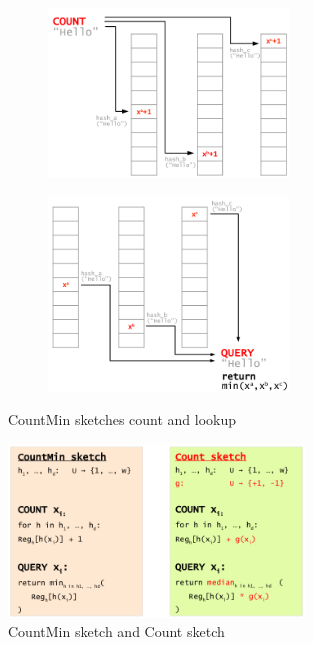 \documentclass[11pt,oneside,a4paper]{article}
\begin{document}
\begin{figure}[b!]
	\centering
	\begin{subfigure}[t]{.5\textwidth}
		\centering
		\includegraphics[width=0.7\textwidth,scale=1]{figures/countminsketch_count}
		\label{fig:countminsketch_count}
	\end{subfigure}%
	\begin{subfigure}[t]{.5\textwidth}
		\centering
		\includegraphics[width=0.7\textwidth,scale=1]{figures/countminsketch_lookup}
		\label{fig:countminsketch_lookup}
	\end{subfigure}
	\caption{CountMin sketches count and lookup \cite{advnet}}
\end{figure}

\newpage

\begin{figure}[t!]
	\centering
	\includegraphics[width=0.7\textwidth,scale=1]{figures/sketches}
	\caption{CountMin sketch and Count sketch \cite{advnet}}
	\label{fig:sketches}
\end{figure}
\end{document}
